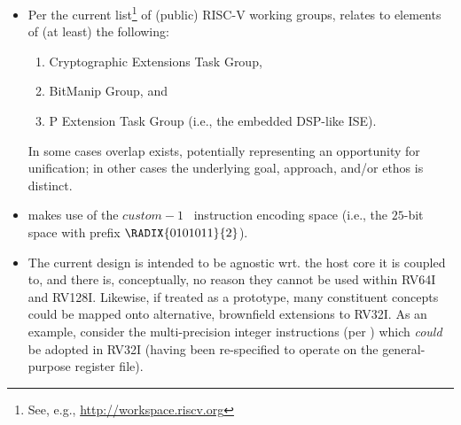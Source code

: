 \begin{itemize}

\item Per the current list\footnote{
      See, e.g., \url{http://workspace.riscv.org}
      } of (public) RISC-V working groups, 
      \ISE relates to elements of (at least) the following:

      \begin{enumerate}
      \item Cryptographic Extensions Task Group,
      \item BitManip                      Group,
            and
      \item P             Extension  Task Group (i.e., the embedded DSP-like ISE).
      \end{enumerate}

      \noindent
      In some cases overlap exists, potentially representing an opportunity
      for unification; in other cases the underlying goal, approach, and/or
      ethos is distinct.

\item \ISE makes use of the $custom-1$~\cite[Table 19.1]{SCARV:RV:ISA:I:17}
      instruction encoding space 
      (i.e., the $25$-bit space with prefix $\RADIX{0101011}{2}$).

\item The current design is intended to be agnostic wrt. the host core it
      is coupled to, and there is, conceptually, no reason they cannot be 
      used within RV64I and RV128I.
      Likewise, if treated as a prototype, many constituent concepts could
      be mapped onto alternative, brownfield extensions to RV32I.
      As an example, consider the multi-precision integer instructions 
      (per )
      which {\em could} be adopted in RV32I (having been re-specified to
      operate on the general-purpose register file).

\end{itemize}

